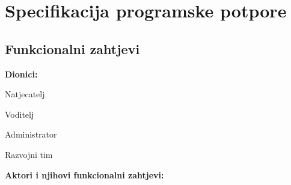 \chapter{Specifikacija programske potpore}
		
	\section{Funkcionalni zahtjevi}
			
			\noindent \textbf{Dionici:}
			
			\begin{packed_enum}
				
				\item Natjecatelj
				\item Voditelj
				\item Administrator				
				\item Razvojni tim
				
			\end{packed_enum}
			
			\noindent \textbf{Aktori i njihovi funkcionalni zahtjevi:}
			
